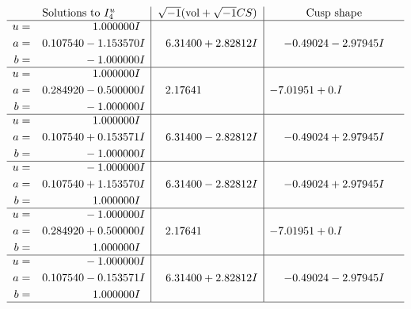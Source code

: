 \documentclass[1p]{elsarticle_modified}
\theoremstyle{definition}
\newcommand{\I}{\sqrt{-1}}
\begin{document}
$$\begin{array}{c|c|c}  
\text{Solutions to }I^u_{4}& \I (\text{vol} + \sqrt{-1}CS) & \text{Cusp shape}\\
 \hline 
\begin{aligned}
u &= \phantom{-0.000000 -}1.000000 I \\
a &= \phantom{-}0.107540 - 1.153570 I \\
b &= \phantom{-0.000000 } -1.000000 I\end{aligned}
 & \phantom{-}6.31400 + 2.82812 I & -0.49024 - 2.97945 I \\ \hline\begin{aligned}
u &= \phantom{-0.000000 -}1.000000 I \\
a &= \phantom{-}0.284920 - 0.500000 I \\
b &= \phantom{-0.000000 } -1.000000 I\end{aligned}
 & \phantom{-}2.17641\phantom{ +0.000000I} & -7.01951 + 0. I\phantom{ +0.000000I} \\ \hline\begin{aligned}
u &= \phantom{-0.000000 -}1.000000 I \\
a &= \phantom{-}0.107540 + 0.153571 I \\
b &= \phantom{-0.000000 } -1.000000 I\end{aligned}
 & \phantom{-}6.31400 - 2.82812 I & -0.49024 + 2.97945 I \\ \hline\begin{aligned}
u &= \phantom{-0.000000 } -1.000000 I \\
a &= \phantom{-}0.107540 + 1.153570 I \\
b &= \phantom{-0.000000 -}1.000000 I\end{aligned}
 & \phantom{-}6.31400 - 2.82812 I & -0.49024 + 2.97945 I \\ \hline\begin{aligned}
u &= \phantom{-0.000000 } -1.000000 I \\
a &= \phantom{-}0.284920 + 0.500000 I \\
b &= \phantom{-0.000000 -}1.000000 I\end{aligned}
 & \phantom{-}2.17641\phantom{ +0.000000I} & -7.01951 + 0. I\phantom{ +0.000000I} \\ \hline\begin{aligned}
u &= \phantom{-0.000000 } -1.000000 I \\
a &= \phantom{-}0.107540 - 0.153571 I \\
b &= \phantom{-0.000000 -}1.000000 I\end{aligned}
 & \phantom{-}6.31400 + 2.82812 I & -0.49024 - 2.97945 I\\
 \hline 
 \end{array}$$\newpage\newpage\renewcommand{\arraystretch}{1}
\end{document}
